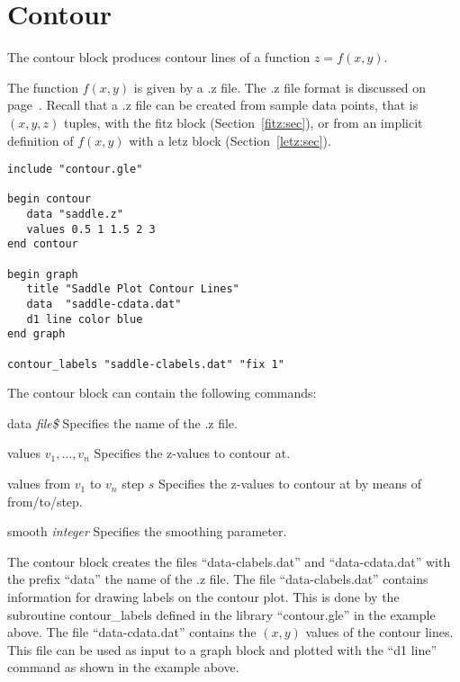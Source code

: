 \section{Contour}

The contour block produces contour lines of a function $z = f(x,y)$.

The function $f(x,y)$ is given by a .z file. The .z file format is discussed on page~\pageref{zfile:pg}. Recall that a .z file can be created from sample data points, that is $(x,y,z)$ tuples, with the {\sf fitz} block (Section~\ref{fitz:sec}), or from an implicit definition of $f(x,y)$ with a {\sf letz} block (Section~\ref{letz:sec}).

\begin{minipage}[c]{8cm}
\begin{Verbatim}
include "contour.gle"

begin contour
   data "saddle.z"
   values 0.5 1 1.5 2 3
end contour

begin graph
   title "Saddle Plot Contour Lines"
   data  "saddle-cdata.dat"
   d1 line color blue
end graph

contour_labels "saddle-clabels.dat" "fix 1"
\end{Verbatim}
\end{minipage}
\hfill
\begin{minipage}[c]{7cm}
\mbox{}
\end{minipage}

The contour block can contain the following commands:

\begin{commanddescription}
\item[{\sf data {\it file\$}}] Specifies the name of the .z file.

\item[{\sf values $v_1,\ldots, v_n$}] Specifies the z-values to contour at.

\item[{\sf values from $v_1$ to $v_n$ step $s$}] Specifies the z-values to contour at by means of from/to/step.

\item[{\sf smooth {\it integer}}] Specifies the smoothing parameter.
\end{commanddescription}

The contour block creates the files ``data-clabels.dat'' and ``data-cdata.dat'' with the prefix ``data'' the name of the .z file. The file ``data-clabels.dat'' contains information for drawing labels on the contour plot. This is done by the subroutine {\sf contour\_labels} defined in the library ``contour.gle'' in the example above. The file ``data-cdata.dat'' contains the $(x,y)$ values of the contour lines. This file can be used as input to a graph block and plotted with the ``d1 line'' command as shown in the example above.


